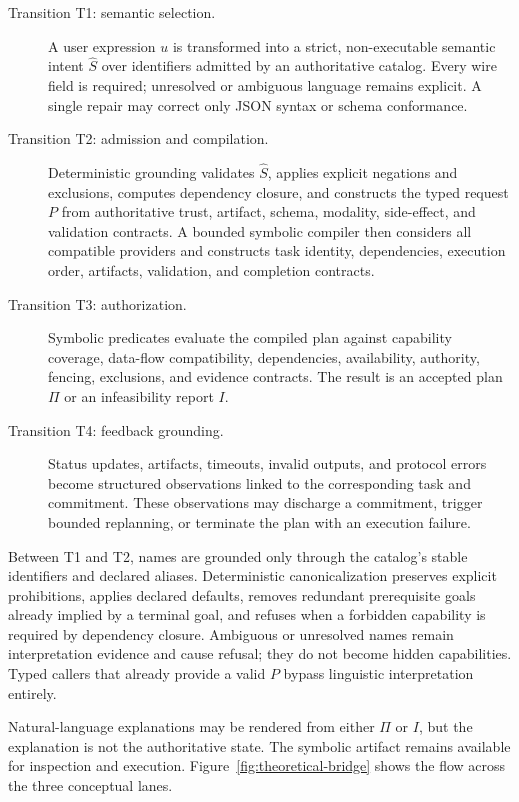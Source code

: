 \begin{description}
  \item[Transition T1: semantic selection.] A user expression $u$ is transformed into a strict, non-executable semantic intent $\widehat{S}$ over identifiers admitted by an authoritative catalog. Every wire field is required; unresolved or ambiguous language remains explicit. A single repair may correct only JSON syntax or schema conformance.
  \item[Transition T2: admission and compilation.] Deterministic grounding validates $\widehat{S}$, applies explicit negations and exclusions, computes dependency closure, and constructs the typed request $P$ from authoritative trust, artifact, schema, modality, side-effect, and validation contracts. A bounded symbolic compiler then considers all compatible providers and constructs task identity, dependencies, execution order, artifacts, validation, and completion contracts.
  \item[Transition T3: authorization.] Symbolic predicates evaluate the compiled plan against capability coverage, data-flow compatibility, dependencies, availability, authority, fencing, exclusions, and evidence contracts. The result is an accepted plan $\Pi$ or an infeasibility report $I$.
  \item[Transition T4: feedback grounding.] Status updates, artifacts, timeouts, invalid outputs, and protocol errors become structured observations linked to the corresponding task and commitment. These observations may discharge a commitment, trigger bounded replanning, or terminate the plan with an execution failure.
\end{description}

Between T1 and T2, names are grounded only through the catalog's stable identifiers and declared aliases. Deterministic canonicalization preserves explicit prohibitions, applies declared defaults, removes redundant prerequisite goals already implied by a terminal goal, and refuses when a forbidden capability is required by dependency closure. Ambiguous or unresolved names remain interpretation evidence and cause refusal; they do not become hidden capabilities. Typed callers that already provide a valid $P$ bypass linguistic interpretation entirely.

Natural-language explanations may be rendered from either $\Pi$ or $I$, but the explanation is not the authoritative state. The symbolic artifact remains available for inspection and execution. Figure~\ref{fig:theoretical-bridge} shows the flow across the three conceptual lanes.

